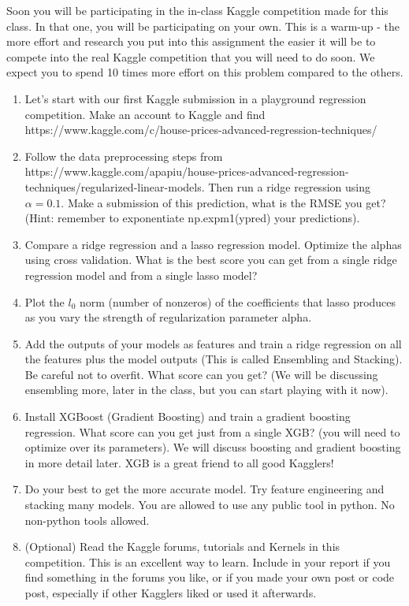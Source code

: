 \documentclass[12pt]{article}%
\begin{document}
Soon you will be participating in the in-class Kaggle competition made for this class. In that one, you will be participating on your own. This is a warm-up - the more effort and research you put into this assignment the easier it will be to compete into the real Kaggle competition that you will need to do soon. We expect you to spend 10 times more effort on this problem compared to the others.
\begin{enumerate}
    \item Let's start with our first Kaggle submission in a playground regression competition. Make an account to Kaggle and find https://www.kaggle.com/c/house-prices-advanced-regression-techniques/
    \item Follow the data preprocessing steps from https://www.kaggle.com/apapiu/house-prices-advanced-regression-techniques/regularized-linear-models. Then run a ridge regression using $\alpha = 0.1$. Make a submission of this prediction, what is the RMSE you get? (Hint: remember to exponentiate np.expm1(ypred) your predictions).
    \item Compare a ridge regression and a lasso regression model. Optimize the alphas using cross validation. What is the best score you can get from a single ridge regression model and from a single lasso model?
    \item Plot the $l_0$ norm (number of nonzeros) of the coefficients that lasso produces as you vary the strength of regularization parameter alpha.
    \item Add the outputs of your models as features and train a ridge regression on all the features plus the model outputs (This is called Ensembling and Stacking). Be careful not to overfit. What score can you get? (We will be discussing ensembling more, later in the class, but you can start playing with it now).
    \item Install XGBoost (Gradient Boosting) and train a gradient boosting regression. What score can you get just from a single XGB? (you will need to optimize over its parameters). We will discuss boosting and gradient boosting in more detail later. XGB is a great friend to all good Kagglers!
    \item Do your best to get the more accurate model. Try feature engineering and stacking many models. You are allowed to use any public tool in python. No non-python tools allowed.
    \item (Optional) Read the Kaggle forums, tutorials and Kernels in this competition. This is an excellent way to learn. Include in your report if you find something in the forums you like, or if you made your own post or code post, especially if other Kagglers liked or used it afterwards.

\end{enumerate}
\end{document}
